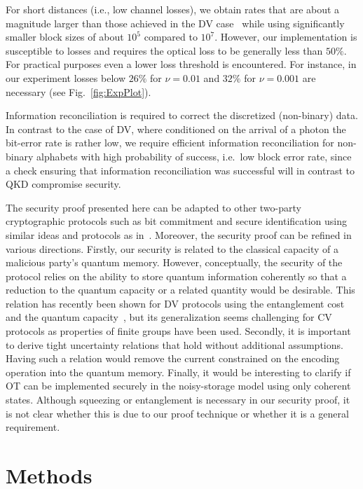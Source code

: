 \documentclass[aps,amsfonts,twoside,amssymb,superscriptaddress,twocolumn]{revtex4-1}
\begin{document}
For short distances (i.e., low channel losses), we obtain rates that are about a magnitude larger than those achieved in the DV case~\cite{erven2014experimental} while using significantly smaller block sizes of about $10^5$ compared to $10^7$. 
However, our implementation is susceptible to losses and requires the optical loss to be generally less than $50\%$. 
For practical purposes even a lower loss threshold is encountered. For
instance, in our experiment losses below $26\%$ for $\nu = 0.01$ and
$32\%$ for $\nu=0.001$ are necessary (see
Fig.~\ref{fig:ExpPlot}). 

Information reconciliation is required to correct the discretized (non-binary) data.
In contrast to the case of DV, where conditioned on the arrival of a photon the bit-error rate is rather low, we require efficient information reconciliation for non-binary alphabets with high probability of success, i.e.\ low block error rate, since a check ensuring that information reconciliation was successful will in contrast to QKD compromise security.


The security proof presented here can be adapted to other two-party cryptographic protocols such as bit commitment and secure identification using similar ideas and protocols as in~\cite{damgaard2008,Koenig2012,schaffner2010,ng2012}. Moreover, the security proof can be refined in various directions. Firstly, our security is related to the classical capacity of a malicious party's quantum memory. However, conceptually, the security of the protocol relies on the ability to store quantum information coherently so that a reduction to the quantum capacity or a related quantity would be desirable. This relation has recently been shown for DV protocols using the entanglement cost~\cite{Berta2012} and the quantum capacity~\cite{Berta12_2,berta2013,Dupuis2015}, but its generalization seems challenging for CV protocols as properties of finite groups have been used. Secondly, it is important to derive tight uncertainty relations that hold without additional assumptions. Having such a relation would remove the current constrained on the encoding operation into the quantum memory. Finally, it would be interesting to clarify if  OT can be implemented securely in the noisy-storage model using only coherent states. Although squeezing or entanglement is necessary in our security proof, it is not clear whether this is due to our proof technique or whether it is a general requirement. 



\section{Methods} 
\end{document}
